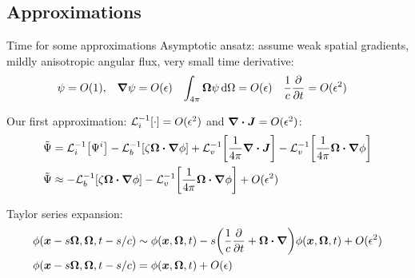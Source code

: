 \documentclass{beamer}
\begin{document}
\subsection{Approximations}
\begin{frame}{Time for some approximations}
  Asymptotic ansatz: assume weak spatial gradients, mildly anisotropic angular flux, very small time
  derivative:
\begin{align*}
  \psi &= O(1), &
  \bm{\nabla} \psi &= O(\epsilon)&
  \int_{4\pi} \bm{\Omega} \psi\mathop{}\!\mathrm{d}\Omega &= O(\epsilon)&
  \frac{1}{c} \frac{\partial }{\partial t} &= O(\epsilon^2)
\end{align*}

Our first approximation: $\mathcal{L}_{i}^{-1}\!\left[\cdot\right] = O(\epsilon^2)$ and $\bm{\nabla} \bm{\cdot} \bm{J} =
O(\epsilon^2)$:
\begin{align*}
  \tilde \Psi &=
  \mathcal{L}_{i}^{-1}\!\left[\Psi^i\right]
  - \mathcal{L}_{b}^{-1}\!\left[\zeta\bm{\Omega}\bm{\cdot} \bm{\nabla} \phi\right]
  + \mathcal{L}_{v}^{-1}\!\left[\frac{1}{4\pi} \bm{\nabla} \bm{\cdot}\bm{J}\right] -
  \mathcal{L}_{v}^{-1}\!\left[\frac{1}{4\pi} \bm{\Omega}\bm{\cdot} \bm{\nabla} \phi\right]
    \\ 
  \tilde \Psi 
  &\approx -\mathcal{L}_{b}^{-1}\!\left[\zeta\bm{\Omega}\bm{\cdot} \bm{\nabla} \phi\right]
  - \mathcal{L}_{v}^{-1}\!\left[\frac{1}{4\pi} \bm{\Omega}\bm{\cdot} \bm{\nabla} \phi\right]
  + O(\epsilon^2)
\end{align*}

Taylor series expansion:
\begin{align} \nonumber
  \phi(\bm{x} - s\bm{\Omega}, \bm{\Omega}, t - s/c)
  &\sim \phi(\bm{x}, \bm{\Omega}, t)
  - s \bigg( \frac{1}{c} \frac{\partial }{\partial t} + \bm{\Omega} \bm{\cdot} \bm{\nabla} \bigg)
  \phi(\bm{x}, \bm{\Omega}, t) + O(\epsilon^2)
\\ \label{eq:taylorPhi}
\phi(\bm{x} - s\bm{\Omega}, \bm{\Omega}, t - s/c)
&= \phi(\bm{x}, \bm{\Omega}, t) + O(\epsilon)
\end{align}
\end{frame}
\end{document}
